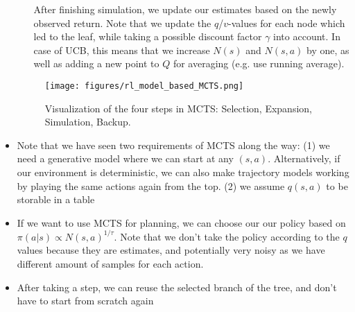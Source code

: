 \begin{itemize}
\begin{enumerate}
		After finishing simulation, we update our estimates based on the newly observed return. Note that we update the $q$/$v$-values for each node which led to the leaf, while taking a possible discount factor $\gamma$ into account. In case of UCB, this means that we increase $N(s)$ and $N(s,a)$ by one, as well as adding a new point to $Q$ for averaging (e.g. use running average).
	\end{enumerate}
	\begin{figure}[ht!]
		\centering
		\texttt{[image: figures/rl\_model\_based\_MCTS.png]}
		\caption{Visualization of the four steps in MCTS: Selection, Expansion, Simulation, Backup.}
		\label{fig:rl_model_based_MCTS}
	\end{figure}
	\item Note that we have seen two requirements of MCTS along the way: (1) we need a generative model where we can start at any $(s,a)$. Alternatively, if our environment is deterministic, we can also make trajectory models working by playing the same actions again from the top. (2) we assume $q(s,a)$ to be storable in a table
	\item If we want to use MCTS for planning, we can choose our our policy based on $\pi(a|s)\propto N(s,a)^{1/\tau}$. Note that we don't take the policy according to the $q$ values because they are estimates, and potentially very noisy as we have different amount of samples for each action.
	\item After taking a step, we can reuse the selected branch of the tree, and don't have to start from scratch again
\end{itemize}
